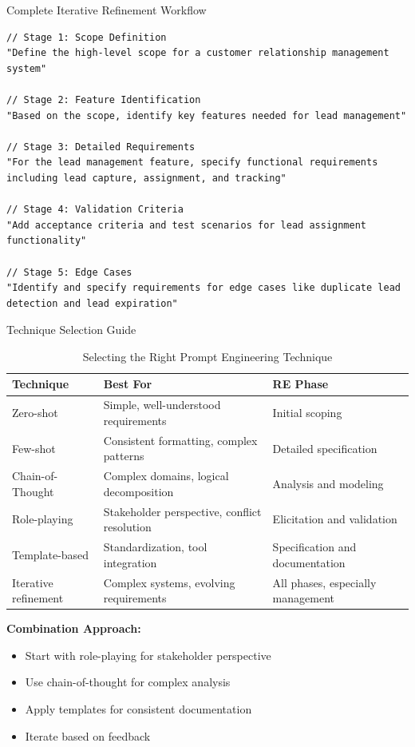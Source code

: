 \documentclass{beamer}
\begin{document}
\begin{frame}[fragile]{Complete Iterative Refinement Workflow}
    \begin{lstlisting}[style=code, caption={Multi-stage Refinement Process}]
// Stage 1: Scope Definition
"Define the high-level scope for a customer relationship management system"

// Stage 2: Feature Identification  
"Based on the scope, identify key features needed for lead management"

// Stage 3: Detailed Requirements
"For the lead management feature, specify functional requirements including lead capture, assignment, and tracking"

// Stage 4: Validation Criteria
"Add acceptance criteria and test scenarios for lead assignment functionality"

// Stage 5: Edge Cases
"Identify and specify requirements for edge cases like duplicate lead detection and lead expiration"
    \end{lstlisting}
\end{frame}

\begin{frame}[t]{Technique Selection Guide}
    \begin{table}
        \scriptsize
        \centering
        \begin{tabular}{p{}|p{}|p{}}
            \textbf{Technique} & \textbf{Best For} & \textbf{RE Phase} \\
            \hline
            Zero-shot & Simple, well-understood requirements & Initial scoping \\
            Few-shot & Consistent formatting, complex patterns & Detailed specification \\
            Chain-of-Thought & Complex domains, logical decomposition & Analysis and modeling \\
            Role-playing & Stakeholder perspective, conflict resolution & Elicitation and validation \\
            Template-based & Standardization, tool integration & Specification and documentation \\
            Iterative refinement & Complex systems, evolving requirements & All phases, especially management \\
        \end{tabular}
        \caption{Selecting the Right Prompt Engineering Technique}
    \end{table}
    
    \textbf{Combination Approach:}
    \scriptsize
    \begin{itemize}
        \item Start with role-playing for stakeholder perspective
        \item Use chain-of-thought for complex analysis
        \item Apply templates for consistent documentation
        \item Iterate based on feedback
    \end{itemize}
\end{frame}
\end{document}
